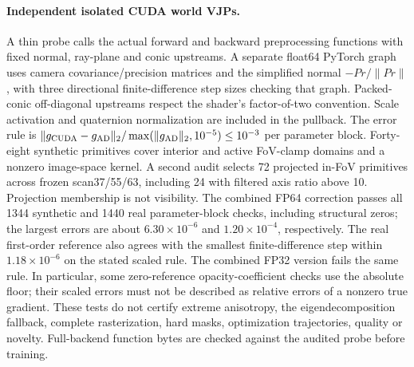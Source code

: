 \documentclass[11pt,a4paper]{article}
\begin{document}
\paragraph{Independent isolated CUDA world VJPs.}
A thin probe calls the actual forward and backward preprocessing
functions with fixed normal, ray-plane and conic upstreams. A separate
float64 PyTorch graph uses camera covariance/precision matrices and
the simplified normal $-Pr/\|Pr\|$, with three directional finite-difference
step sizes checking that graph. Packed-conic off-diagonal upstreams
respect the shader's factor-of-two convention. Scale activation and
quaternion normalization are included in the pullback.
The error rule is $\|g_{\rm CUDA}-g_{\rm AD}\|_2/
\max(\|g_{\rm AD}\|_2,10^{-5})\le10^{-3}$ per parameter block.
Forty-eight synthetic primitives cover interior and active FoV-clamp
domains and a nonzero image-space kernel. A second audit selects 72
projected in-FoV primitives across frozen scan37/55/63, including
24 with filtered axis ratio above 10. Projection membership is not
visibility. The combined FP64 correction passes all 1344 synthetic
and 1440 real parameter-block checks, including structural zeros;
the largest errors are about $6.30\times10^{-6}$ and
$1.20\times10^{-4}$, respectively. The real first-order reference
also agrees with the smallest finite-difference step within
$1.18\times10^{-6}$ on the stated scaled rule.
The combined FP32 version fails the same rule. In particular, some
zero-reference opacity-coefficient checks use the absolute floor;
their scaled errors must not be described as relative errors of a
nonzero true gradient. These tests do not certify extreme anisotropy,
the eigendecomposition fallback, complete rasterization, hard masks,
optimization trajectories, quality or novelty. Full-backend function
bytes are checked against the audited probe before training.
\end{document}
